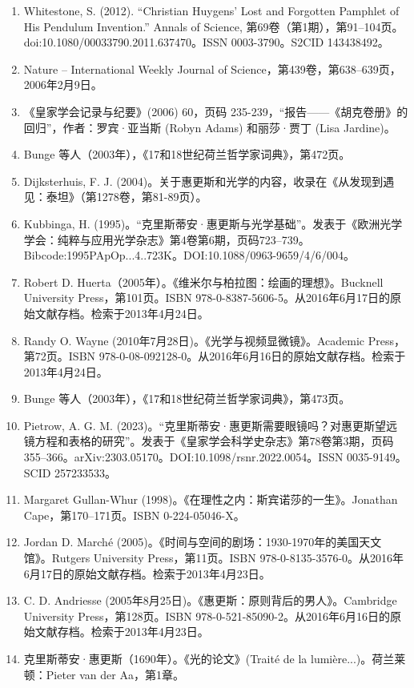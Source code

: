 \begin{enumerate}
\item Whitestone, S. (2012). “Christian Huygens' Lost and Forgotten Pamphlet of His Pendulum Invention.” Annals of Science, 第69卷（第1期），第91–104页。doi:10.1080/00033790.2011.637470。ISSN 0003-3790。S2CID 143438492。
\item Nature – International Weekly Journal of Science，第439卷，第638–639页，2006年2月9日。
\item 《皇家学会记录与纪要》(2006) 60，页码 235-239，“报告——《胡克卷册》的回归”，作者：罗宾·亚当斯 (Robyn Adams) 和丽莎·贾丁 (Lisa Jardine)。
\item Bunge 等人（2003年），《17和18世纪荷兰哲学家词典》，第472页。
\item Dijksterhuis, F. J. (2004)。关于惠更斯和光学的内容，收录在《从发现到遇见：泰坦》（第1278卷，第81-89页）。
\item Kubbinga, H. (1995)。“克里斯蒂安·惠更斯与光学基础”。发表于《欧洲光学学会：纯粹与应用光学杂志》第4卷第6期，页码723–739。Bibcode:1995PApOp...4..723K。DOI:10.1088/0963-9659/4/6/004。
\item Robert D. Huerta（2005年）。《维米尔与柏拉图：绘画的理想》。Bucknell University Press，第101页。ISBN 978-0-8387-5606-5。从2016年6月17日的原始文献存档。检索于2013年4月24日。
\item Randy O. Wayne (2010年7月28日)。《光学与视频显微镜》。Academic Press，第72页。ISBN 978-0-08-092128-0。从2016年6月16日的原始文献存档。检索于2013年4月24日。
\item Bunge 等人（2003年），《17和18世纪荷兰哲学家词典》，第473页。
\item Pietrow, A. G. M. (2023)。“克里斯蒂安·惠更斯需要眼镜吗？对惠更斯望远镜方程和表格的研究”。发表于《皇家学会科学史杂志》第78卷第3期，页码355–366。arXiv:2303.05170。DOI:10.1098/rsnr.2022.0054。ISSN 0035-9149。SCID 257233533。
\item Margaret Gullan-Whur (1998)。《在理性之内：斯宾诺莎的一生》。Jonathan Cape，第170–171页。ISBN 0-224-05046-X。
\item Jordan D. Marché (2005)。《时间与空间的剧场：1930-1970年的美国天文馆》。Rutgers University Press，第11页。ISBN 978-0-8135-3576-0。从2016年6月17日的原始文献存档。检索于2013年4月23日。
\item C. D. Andriesse (2005年8月25日)。《惠更斯：原则背后的男人》。Cambridge University Press，第128页。ISBN 978-0-521-85090-2。从2016年6月16日的原始文献存档。检索于2013年4月23日。
\item 克里斯蒂安·惠更斯（1690年）。《光的论文》(Traité de la lumière...)。荷兰莱顿：Pieter van der Aa，第1章。

\end{enumerate}
